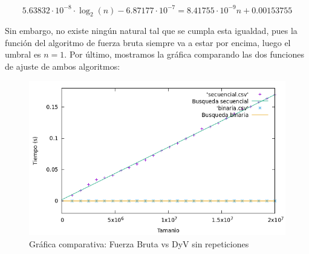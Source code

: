 \documentclass[10pt,a4paper]{article}
\begin{document}
\begin{enumerate}
 \[
 5.63832 \cdot 10^{-8} \cdot \log_{2}(n) - 6.87177 \cdot 10^{-7} = 8.41755 \cdot 10^{-9} n + 0.00153755
 \]
 
 Sin embargo, no existe ningún natural tal que se cumpla esta igualdad, pues la función del algoritmo de fuerza bruta siempre va a estar por encima, luego el umbral es $n = 1$. Por último, mostramos la gráfica comparando las dos funciones de ajuste de ambos algoritmos:
 
 
  \begin{figure}[h!]
 	\centering
 	\includegraphics[scale=0.55]{./Images/Grafica_secvsbin.png}
 	\caption{Gráfica comparativa: Fuerza Bruta vs DyV sin repeticiones}
 \end{figure}
\end{enumerate}
\end{document}

